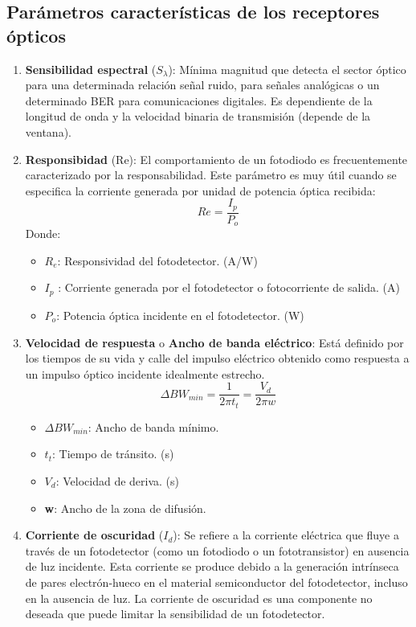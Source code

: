 \documentclass[
	12pt, %
	fleqn, %
	a4paper, %
	oneside, %
]{LegrandOrangeBook}
\begin{document}
\subsection{Parámetros características de los receptores ópticos}
\begin{enumerate}
\item \textbf{Sensibilidad espectral} ($S_{\lambda}$): Mínima magnitud que detecta el sector óptico para una determinada relación señal ruido,  para señales analógicas o un determinado BER para comunicaciones digitales. Es dependiente de la longitud de onda y la velocidad binaria de transmisión (depende de la ventana).
\item \textbf{Responsibidad} (Re): El comportamiento de un fotodiodo es frecuentemente caracterizado por la responsabilidad. Este parámetro es muy útil cuando se especifica la corriente generada por unidad de potencia óptica recibida:
\begin{equation}
Re=\frac{I_p}{P_o}
\end{equation}
Donde:
\begin{itemize}
\item $R_e$: Responsividad del fotodetector. (A/W)
\item $I_p$ : Corriente generada por el fotodetector o fotocorriente de salida. (A)
\item $P_o$: Potencia óptica incidente en el fotodetector. (W)
\end{itemize}
\item \textbf{Velocidad de respuesta} o \textbf{Ancho de banda eléctrico}: Está definido por los tiempos de su vida y calle del impulso eléctrico obtenido como respuesta a un impulso óptico incidente idealmente estrecho. 
\begin{equation}
\Delta BW_{min}=\frac{1}{2\pi t_{t}}=\frac{V_d}{2\pi w}
\end{equation}
\begin{itemize}
\item $\Delta BW_{min}$: Ancho de banda mínimo.
\item $t_{t}$: Tiempo de tránsito. (s)
\item $V_d$: Velocidad de deriva. (s)
\item \textbf{w}: Ancho de la zona de difusión.
\end{itemize}
\item \textbf{Corriente de oscuridad} ($I_d$): Se refiere a la corriente eléctrica que fluye a través de un fotodetector (como un fotodiodo o un fototransistor) en ausencia de luz incidente. Esta corriente se produce debido a la generación intrínseca de pares electrón-hueco en el material semiconductor del fotodetector, incluso en la ausencia de luz. La corriente de oscuridad es una componente no deseada que puede limitar la sensibilidad de un fotodetector.

\end{enumerate}
\end{document}
